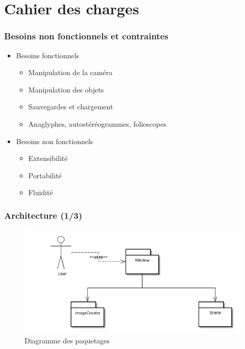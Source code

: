 \documentclass{beamer}
\begin{document}
%
\section{Cahier des charges}


\begin{frame}
\frametitle{Besoins non fonctionnels et contraintes}
\begin{itemize}[label=$\bullet$]
\item Besoins fonctionnels
	\begin{itemize}[label=$\circ$]
	\item Manipulation de la caméra
	\item Manipulation des objets
	\item Sauvegardes et chargement
	\item Anaglyphes, autostéréogrammes, folioscopes
	\end{itemize}
\item Besoins non fonctionnels
	\begin{itemize}[label=$\circ$]
	\item Extensibilité
	\item Portabilité
	\item Fluidité
	\end{itemize}
\end{itemize}
\end{frame}


\begin{frame}
\frametitle{Architecture (1/3)}
\centering
\begin{figure}
  \includegraphics[scale=0.4]{paquetages.jpg}
  \caption{Diagramme des paquetages}
\end{figure}
\end{frame}
\end{document}
